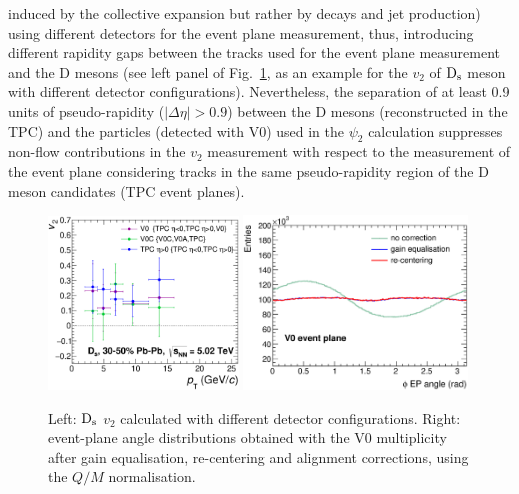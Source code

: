induced by the collective expansion but rather by decays and 
jet production) using different detectors
for the event plane measurement, thus, introducing different
rapidity gaps between the tracks used for the event plane measurement
and the D mesons (see left panel of Fig.~\ref{fig:QoverMCalibration},
as an example for the $v_2$ of ${\rm D_s}$ meson with different detector configurations).
Nevertheless, the separation of at least 0.9 units of pseudo-rapidity 
($|\Delta\eta|>0.9$) between the D mesons (reconstructed in the TPC)
and the particles (detected with V0) used in the $\psi_2$ calculation
suppresses non-flow contributions in the $v_2$ measurement with respect
to the measurement of the event plane considering tracks in the same
pseudo-rapidity region of the D meson candidates (TPC event planes).
\\

\begin{figure}
\centering
  \includegraphics[width=0.45\textwidth]{FigCap5/v2_diffDetComparison.eps}
 \includegraphics[width=0.53\textwidth]{FigCap5/V0EvPlaneDitrib.eps}
 \caption{Left: ${\rm D_s}$ $v_2$ calculated with different detector configurations. Right: event-plane angle distributions obtained with the V0 multiplicity after gain equalisation, re-centering and alignment corrections, using the $Q/M$ normalisation.}
   \label{fig:QoverMCalibration}
\end{figure}




